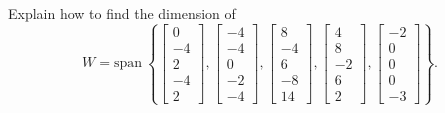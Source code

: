 \documentclass{article}
\begin{document}
\begin{exerciseStatement}
    Explain how to find the dimension of
\[W=\mathrm{span}\ \left\{\left[\begin{array}{r}
0 \\
-4 \\
2 \\
-4 \\
2
\end{array}\right] , \left[\begin{array}{r}
-4 \\
-4 \\
0 \\
-2 \\
-4
\end{array}\right] , \left[\begin{array}{r}
8 \\
-4 \\
6 \\
-8 \\
14
\end{array}\right] , \left[\begin{array}{r}
4 \\
8 \\
-2 \\
6 \\
2
\end{array}\right] , \left[\begin{array}{r}
-2 \\
0 \\
0 \\
0 \\
-3
\end{array}\right]\right\}.\]



  
\end{exerciseStatement}
\end{document}
